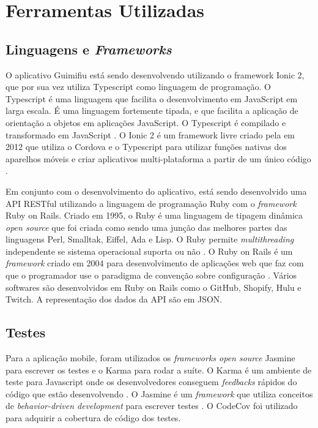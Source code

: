 \section{Ferramentas Utilizadas}

\subsection{Linguagens e \textit{Frameworks}}

O aplicativo Guimifiu está sendo desenvolvendo utilizando o framework Ionic 2, que por sua vez utiliza Typescript como linguagem de programação. O Typescript é uma linguagem que facilita o desenvolvimento em JavaScript em larga escala. É uma linguagem fortemente tipada, e que facilita a aplicação de orientação a objetos em aplicações JavaScript. O Typescript é compilado e transformado em JavaScript \cite{typescript}. O Ionic 2 é um framework livre criado pela em 2012 que utiliza o Cordova e o Typescript para utilizar funções nativas dos aparelhos móveis e criar aplicativos multi-plataforma a partir de um único código \cite{ionic-2}.

Em conjunto com o desenvolvimento do aplicativo, está sendo desenvolvido uma API RESTful utilizando a linguagem de programação Ruby com o \textit{framework} Ruby on Rails. Criado em 1995, o Ruby é uma linguagem de tipagem dinâmica \textit{open source} que foi criada como sendo uma junção das melhores partes das linguagens Perl, Smalltak, Eiffel, Ada e Lisp. O Ruby permite \textit{multithreading} independente se sistema operacional suporta ou não \cite{ruby-wow}. O Ruby on Rails é um \textit{framework} criado em 2004 para desenvolvimento de aplicações web que faz com que o programador use o paradigma de convenção sobre configuração \cite{rails}. Vários softwares são desenvolvidos em Ruby on Rails como o GitHub, Shopify, Hulu e Twitch. A representação dos dados da API são em JSON.

\subsection{Testes}

Para a aplicação mobile, foram utilizados os \textit{frameworks open source} Jasmine para escrever os testes e o Karma para rodar a suíte. O Karma é um ambiente de teste para Javascript onde os desenvolvedores conseguem \textit{feedbacks} rápidos do código que estão desenvolvendo \cite{karma}. O Jasmine é um \textit{framework} que utiliza conceitos de \textit{behavior-driven development} para escrever testes \cite{jasmine}. O CodeCov foi utilizado para adquirir a cobertura de código dos testes.

